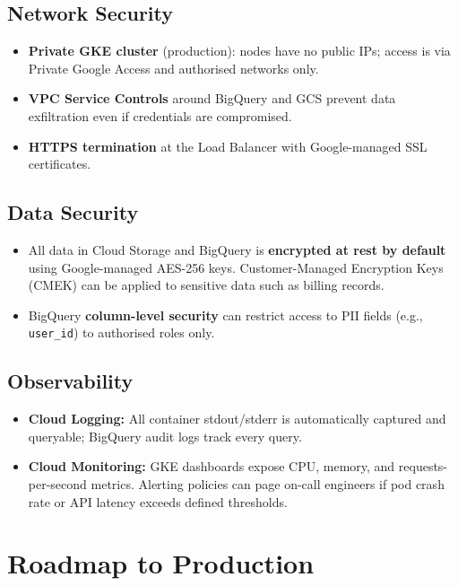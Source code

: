 \documentclass[12pt, a4paper]{article}
\begin{document}
\subsection{Network Security}

\begin{itemize}
    \item \textbf{Private GKE cluster} (production): nodes have no public IPs; access is via Private Google Access and authorised networks only.
    \item \textbf{VPC Service Controls} around BigQuery and GCS prevent data exfiltration even if credentials are compromised.
    \item \textbf{HTTPS termination} at the Load Balancer with Google-managed SSL certificates.
\end{itemize}

\subsection{Data Security}

\begin{itemize}
    \item All data in Cloud Storage and BigQuery is \textbf{encrypted at rest by default} using Google-managed AES-256 keys. Customer-Managed Encryption Keys (CMEK) can be applied to sensitive data such as billing records.
    \item BigQuery \textbf{column-level security} can restrict access to PII fields (e.g., \texttt{user\_id}) to authorised roles only.
\end{itemize}

\subsection{Observability}

\begin{itemize}
    \item \textbf{Cloud Logging:} All container stdout/stderr is automatically captured and queryable; BigQuery audit logs track every query.
    \item \textbf{Cloud Monitoring:} GKE dashboards expose CPU, memory, and requests-per-second metrics. Alerting policies can page on-call engineers if pod crash rate or API latency exceeds defined thresholds.
\end{itemize}

\section{Roadmap to Production}
\end{document}
